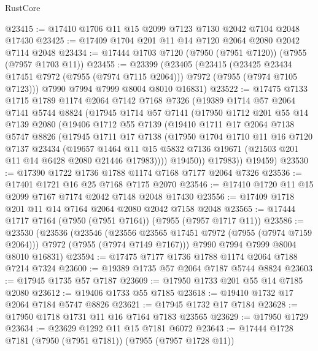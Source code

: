 \begin{lexlean}{RustCore}
\begin{coremodule}
@23415 := @17410 @1706 @11 @15 @2099 @7123 @7130 @2042 @7104 @2048 @17430
@23425 := @17409 @1704 @201 @11 @14 @7120 @2064 @2080 @2042 @7114 @2048
@23434 := @17444 @1703 @7120 (@7950 (@7951 @7120)) (@7955 (@7957 @1703 @11))
@23455 := @23399
    (@23405
      (@23415
        (@23425 @23434 @17451 @7972 (@7955 (@7974 @7115 @2064)))
        @7972
        (@7955 (@7974 @7105 @7123)))
      @7990
      @7994
      @7999
      @8004
      @8010
      @16831)
@23522 := @17475
    @7133
    @1715
    @1789
    @1174
    @2064
    @7142
    @7168
    @7326
    (@19389
      @1714
      @57
      @2064
      @7141
      @5744
      @8824
      (@17945
        @1714
        @57
        @7141
        (@17950
          @1712
          @201
          @55
          @14
          @7139
          @2080
          (@19406
            @1712
            @55
            @7139
            (@19410
              @1711
              @17
              @2064
              @7138
              @5747
              @8826
              (@17945
                @1711
                @17
                @7138
                (@17950
                  @1704
                  @1710
                  @11
                  @16
                  @7120
                  @7137
                  @23434
                  (@19657
                    @1464
                    @11
                    @15
                    @5832
                    @7136
                    @19671
                    (@21503 @201 @11 @14 @6428 @2080 @21446 @17983))))
              @19450))
          @17983))
      @19459)
@23530 := @17390 @1722 @1736 @1788 @1174 @7168 @7177 @2064 @7326
@23536 := @17401 @1721 @16 @25 @7168 @7175 @2070
@23546 := @17410 @1720 @11 @15 @2099 @7167 @7174 @2042 @7148 @2048 @17430
@23556 := @17409 @1718 @201 @11 @14 @7164 @2064 @2080 @2042 @7158 @2048
@23565 := @17444 @1717 @7164 (@7950 (@7951 @7164)) (@7955 (@7957 @1717 @11))
@23586 := @23530
    (@23536
      (@23546
        (@23556 @23565 @17451 @7972 (@7955 (@7974 @7159 @2064)))
        @7972
        (@7955 (@7974 @7149 @7167)))
      @7990
      @7994
      @7999
      @8004
      @8010
      @16831)
@23594 := @17475 @7177 @1736 @1788 @1174 @2064 @7188 @7214 @7324
@23600 := @19389 @1735 @57 @2064 @7187 @5744 @8824
@23603 := @17945 @1735 @57 @7187
@23609 := @17950 @1733 @201 @55 @14 @7185 @2080
@23612 := @19406 @1733 @55 @7185
@23618 := @19410 @1732 @17 @2064 @7184 @5747 @8826
@23621 := @17945 @1732 @17 @7184
@23628 := @17950 @1718 @1731 @11 @16 @7164 @7183 @23565
@23629 := @17950 @1729
@23634 := @23629 @1292 @11 @15 @7181 @6072
@23643 := @17444 @1728 @7181 (@7950 (@7951 @7181)) (@7955 (@7957 @1728 @11))

\end{coremodule}
\end{lexlean}
